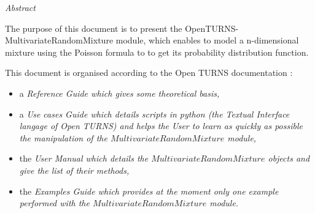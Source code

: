 \vspace{0.5in}
\begin{center}
\vspace{0.3in}
\emph{ Abstract}
\vspace{0.5in}
\end{center}

The purpose of this document is to present the OpenTURNS-MultivariateRandomMixture module, which enables to model a n-dimensional mixture using the 
Poisson formula to to get its probability distribution function.

This document is organised according to the Open TURNS documentation :
\begin{itemize}
\item a \itshape{Reference Guide} which gives some theoretical basis,
\item a \itshape{Use cases Guide} which details scripts in python (the Textual Interface langage of Open TURNS) and helps the User to learn as quickly as possible the manipulation of the $MultivariateRandomMixture$ module,
\item the \itshape{User Manual} which details the $MultivariateRandomMixture$ objects and give the list of their methods,
\item the \itshape{Examples Guide} which provides at the moment only one example performed with the $MultivariateRandomMixture$ module.
\end{itemize}


